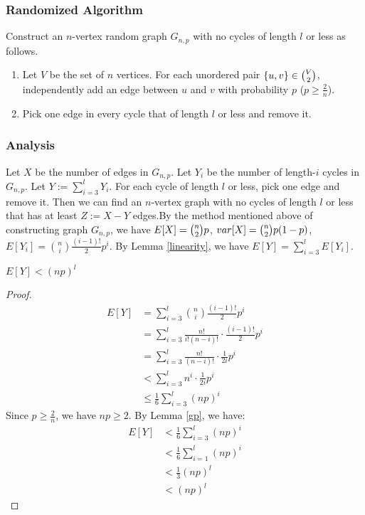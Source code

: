 \subsubsection{Randomized Algorithm}
Construct an $n$-vertex random graph $G_{n,p}$ with no cycles of length $l$ or less as follows. 
\begin{enumerate}
    \item Let $V$ be the set of $n$ vertices. For each unordered pair $\{u,v\}\in \tbinom{V}{2}$, independently add an edge between $u$ and $v$ with probability $p$ ($p\ge \frac{2}{n}$).
    \item Pick one edge in every cycle that of length $l$ or less and remove it.
\end{enumerate}

\subsubsection{Analysis}\label{Analysis} 
Let $X$ be the number of edges in $G_{n,p}$. Let $Y_i$ be the number of length-$i$ cycles in $G_{n,p}$. Let $Y:=\sum_{i=3}^{l}Y_i$.
For each cycle of length $l$ or less, pick one edge and remove it.
Then we can find an $n$-vertex graph with no cycles of length $l$ or less that has at least $Z:=X-Y$ edges.By the method mentioned above of constructing graph $G_{n,p}$, we have $E[X]=\tbinom{n}{2}p$, $var[X]=\tbinom{n}{2}p(1-p)$, $E[Y_i]=\binom{n}{i}\frac{(i-1)!}{2}p^i$. By Lemma \ref{linearity}, we have $E[Y]=\sum_{i=3}^{l}E[Y_i]$.
\begin{claim}
$E[Y]<(np)^l$
\end{claim}
\begin{proof}
\begin{align}
\nonumber E[Y]&=\sum_{i=3}^{l} \binom{n}{i}\frac{(i-1)!}{2}p^i\\
\nonumber &=\sum_{i=3}^{l} \frac{n!}{i!(n-i)!}\cdot\frac{(i-1)!}{2}p^i\\
\nonumber &=\sum_{i=3}^{l} \frac{n!}{(n-i)!}\cdot\frac{1}{2i}p^i\\
\nonumber &<\sum_{i=3}^{l}n^i\cdot\frac{1}{2i}p^i\\
\nonumber &\le \frac{1}{6} \sum_{i=3}^{l}(np)^i
\end{align}
Since $p \ge \frac{2}{n}$, we have $np\ge 2$.
By Lemma \ref{gp}, we have:
\begin{align}
    \nonumber E[Y]& <  \frac{1}{6}\sum_{i=3}^{l}(np)^i \\
    \nonumber & < \frac{1}{6}\sum_{i=1}^{l}(np)^i \\
    \nonumber & < \frac{1}{3}(np)^l\\
    \nonumber & < (np)^l
\end{align}
\end{proof}
